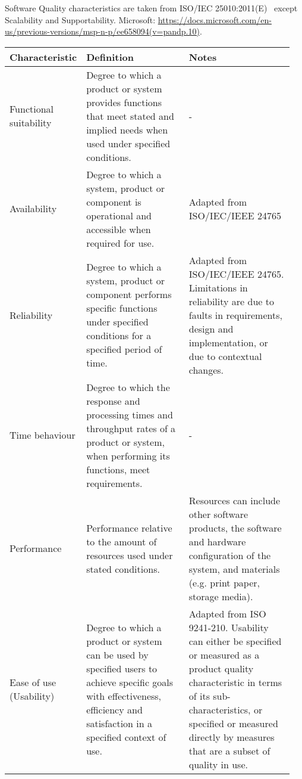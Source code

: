 \begin{center}
\tablefirsthead{}
\tablehead{}
\tabletail{}
\tablelasttail{}
\caption{Software Quality characteristics are taken from ISO/IEC
25010:2011(E)~\cite{1400-1700_isoiec_nodate} except Scalability and Supportability.
Microsoft: \url{https://docs.microsoft.com/en-us/previous-versions/msp-n-p/ee658094(v=pandp.10)}.}
\label{tab:table1}
\tiny
\begin{supertabular}{|p{0.15\linewidth}|p{0.4\linewidth}|p{0.4\linewidth}|}
\hline
\textbf{Characteristic} & \textbf{Definition} & \textbf{Notes} \\
\hline

Functional suitability &
Degree to which a product or system provides functions that meet stated and implied needs when used under specified conditions. &
-
\\ \hline

Availability &
Degree to which a system, product or component is operational and accessible when required for use. &
Adapted from ISO/IEC/IEEE 24765
\\ \hline

Reliability &
Degree to which a system, product or component performs specific functions under specified conditions for a specified period of time. &
Adapted from ISO/IEC/IEEE 24765. Limitations in reliability are due to faults in requirements, design and implementation, or due to contextual changes.
\\ \hline

Time behaviour &
Degree to which the response and processing times and throughput rates of a product or system, when performing its functions, meet requirements. &
-
\\ \hline

Performance &
Performance relative to the amount of resources used under stated conditions. &
Resources can include other software products, the software and hardware configuration of the system, and materials (e.g. print paper, storage media).
\\ \hline

Ease of use (Usability) &
Degree to which a product or system can be used by specified users to achieve specific goals with effectiveness, efficiency and satisfaction in a specified context of use. &
Adapted from ISO 9241-210. Usability can either be specified or measured as a product quality characteristic in terms of its sub-characteristics, or specified or measured directly by measures that are a subset of quality in use.
\\ \hline


\end{supertabular}
\end{center}
